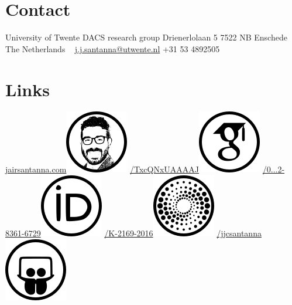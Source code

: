 \documentclass[print]{styles/friggeri-cv-linux} %
\begin{document}

\begin{aside} 
 \section{Contact}
University of Twente
DACS research group
Drienerlolaan 5 
7522 NB Enschede
The Netherlands
~
\href{mailto:j.j.santanna@utwente.nl}{j.j.santanna@utwente.nl}
+31 53 4892505
~
\section{Links}\hspace{-1cm}
\hspace{-0.5cm}\href{http://www.jairsantanna.com}{jairsantanna.com}\includegraphics[scale=0.4]{img/jairsantanna.png}
\href{https://scholar.google.com/citations?user=TxcQNxUAAAAJ}{/TxcQNxUAAAAJ}\includegraphics[scale=0.3]{img/googlescholar.png}
\href{http://orcid.org/0000-0002-8361-6729}{/0...2-8361-6729}\includegraphics[scale=0.3]{img/orcid.png}
\href{http://www.researcherid.com/rid/K-2169-2016}{/K-2169-2016}\includegraphics[scale=0.3]{img/researchid.png}
\href{http://www.slideshare.net/jjcsantanna}{/jjcsantanna}\includegraphics[scale=0.3]{img/slideshare.png}

\end{aside}
\end{document}

